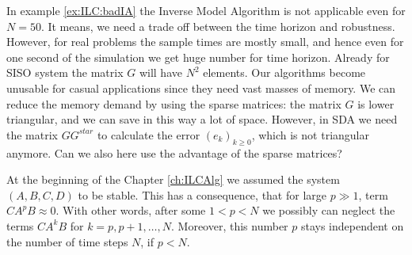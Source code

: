 	In example \ref{ex:ILC:badIA} the Inverse Model Algorithm is not applicable even for $N = 50$. 
	It means, we need a trade off between the time horizon and robustness.
	However, for real problems the sample times are mostly small, and hence even for one second of the simulation we get huge number for time horizon. Already for SISO system the matrix $G$ will have $N^2$ elements. Our algorithms become unusable for casual applications since they need vast masses of memory.	We can reduce the memory demand by using the sparse matrices: the matrix $G$ is lower triangular, and we can save in this way a lot of space. However, in SDA we need the matrix $G G^{star}$ to calculate the error $(e_k)_{k\geq0}$, which is not triangular anymore. Can we also here use the advantage of the sparse matrices? 
	
	At the beginning of the Chapter \ref{ch:ILCAlg} we assumed the system $(A, B, C, D)$ to be stable. 
	This has a consequence, that for large $p \gg 1$, term $C A^p B \approx 0$. With other words, after some $1<p<N$ we possibly can neglect the terms $C A^k B$ for $k = p, p+1, \dots, N$. Moreover, this number $p$ stays independent on the number of time steps $N$, if $p<N$. 
	

